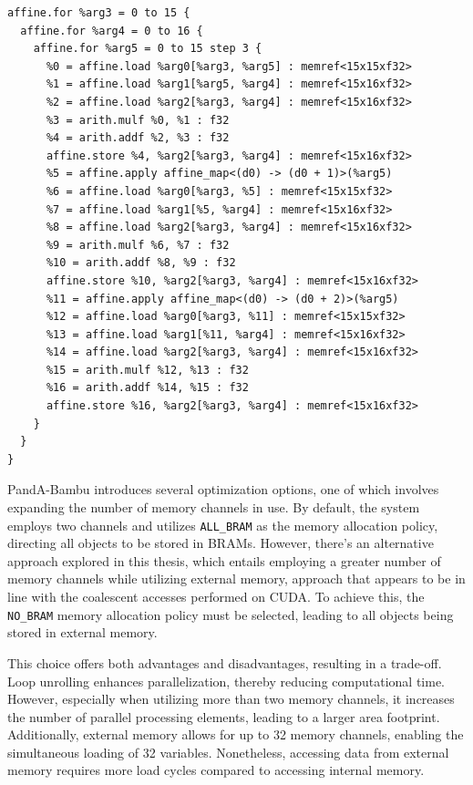 \begin{lstlisting}[label={lst:affine-mul-unroll3}, caption=Unrolled matrix multiplication in affine dialect with unrolling factor 3]
affine.for %arg3 = 0 to 15 {
  affine.for %arg4 = 0 to 16 {
    affine.for %arg5 = 0 to 15 step 3 {
      %0 = affine.load %arg0[%arg3, %arg5] : memref<15x15xf32>
      %1 = affine.load %arg1[%arg5, %arg4] : memref<15x16xf32>
      %2 = affine.load %arg2[%arg3, %arg4] : memref<15x16xf32>
      %3 = arith.mulf %0, %1 : f32
      %4 = arith.addf %2, %3 : f32
      affine.store %4, %arg2[%arg3, %arg4] : memref<15x16xf32>
      %5 = affine.apply affine_map<(d0) -> (d0 + 1)>(%arg5)
      %6 = affine.load %arg0[%arg3, %5] : memref<15x15xf32>
      %7 = affine.load %arg1[%5, %arg4] : memref<15x16xf32>
      %8 = affine.load %arg2[%arg3, %arg4] : memref<15x16xf32>
      %9 = arith.mulf %6, %7 : f32
      %10 = arith.addf %8, %9 : f32
      affine.store %10, %arg2[%arg3, %arg4] : memref<15x16xf32>
      %11 = affine.apply affine_map<(d0) -> (d0 + 2)>(%arg5)
      %12 = affine.load %arg0[%arg3, %11] : memref<15x15xf32>
      %13 = affine.load %arg1[%11, %arg4] : memref<15x16xf32>
      %14 = affine.load %arg2[%arg3, %arg4] : memref<15x16xf32>
      %15 = arith.mulf %12, %13 : f32
      %16 = arith.addf %14, %15 : f32
      affine.store %16, %arg2[%arg3, %arg4] : memref<15x16xf32>
    }
  }
}
\end{lstlisting}

PandA-Bambu introduces several optimization options, one of which involves expanding the number of memory channels in use.
By default, the system employs two channels and utilizes \lstinline{ALL_BRAM} as the memory allocation policy, directing all objects to be stored in BRAMs.
However, there's an alternative approach explored in this thesis, which entails employing a greater number of memory channels while utilizing external memory, approach that appears to be in line with the coalescent accesses performed on CUDA.
To achieve this, the \lstinline{NO_BRAM} memory allocation policy must be selected, leading to all objects being stored in external memory.

This choice offers both advantages and disadvantages, resulting in a trade-off.
Loop unrolling enhances parallelization, thereby reducing computational time.
However, especially when utilizing more than two memory channels, it increases the number of parallel processing elements, leading to a larger area footprint.
Additionally, external memory allows for up to 32 memory channels, enabling the simultaneous loading of 32 variables.
Nonetheless, accessing data from external memory requires more load cycles compared to accessing internal memory.

